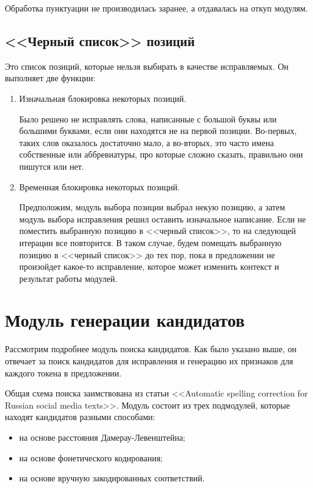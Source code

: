 Обработка пунктуации не производилась заранее, а отдавалась на откуп модулям.

\subsection{<<Черный список>> позиций}

Это список позиций, которые нельзя выбирать в качестве исправляемых. Он выполняет две функции: 
\begin{enumerate}
	\item Изначальная блокировка некоторых позиций. 
	
	Было решено не исправлять слова, написанные с большой буквы или большими буквами, если они находятся не на первой позиции. Во-первых, таких слов оказалось достаточно мало, а во-вторых, это часто имена собственные или аббревиатуры, про которые сложно сказать, правильно они пишутся или нет.
	
	\item Временная блокировка некоторых позиций.
	
	Предположим, модуль выбора позиции выбрал некую позицию, а затем модуль выбора исправления решил оставить изначальное написание. Если не поместить выбранную позицию в <<черный список>>, то на следующей итерации все повторится. В таком случае, будем помещать выбранную позицию в <<черный список>> до тех пор, пока в предложении не произойдет какое-то исправление, которое может изменить контекст и результат работы модулей.
\end{enumerate}

\section{Модуль генерации кандидатов}

Рассмотрим подробнее модуль поиска кандидатов. Как было указано выше, он отвечает за поиск кандидатов для исправления и генерацию их признаков для каждого токена в предложении.

Общая схема поиска заимствована из статьи <<Automatic spelling correction for Russian social media texts>>\cite{Sorokin2016}. Модуль состоит из трех подмодулей, которые находят кандидатов разными способами:
\begin{itemize}
	\item на основе расстояния Дамерау-Левенштейна;
	\item на основе фонетического кодирования;
	\item на основе вручную закодированных соответствий.
\end{itemize}


